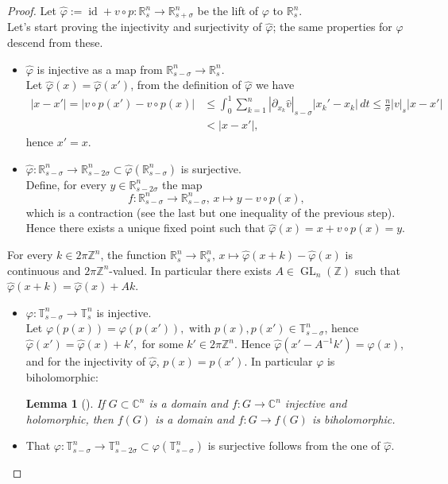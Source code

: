 \documentclass[oneside, 11pt]{amsbook}
\newcommand{\abs}[1]{{\left|#1\right|}}
\newcommand{\T}{\mathbb{T}}
\newcommand{\Z}{\mathbb{Z}}
\newcommand{\R}{\mathbb{R}}
\newcommand{\C}{\mathbb{C}}
\newcommand{\GL}{\operatorname{GL}}
\newcommand{\id}{\operatorname{id}}
\newcommand{\0}{{(0)}}
\newcommand{\3}{{(3)}}
\newtheorem{lemma}{Lemma}
\numberwithin{equation}{section}
\numberwithin{defn}{section}
\numberwithin{prop}{section}
\numberwithin{cor}{section}
\numberwithin{lemma}{section}
\numberwithin{rmk}{section}
\numberwithin{corollary}{section}
\begin{document}
\begin{proof}
	Let $\hat\varphi:= \id + v\circ p : \R^n_s\to\R^n_{s+\sigma}$ be the lift of $\varphi$ to $\R^n_s$.\\Let's start proving the injectivity and surjectivity of $\hat\varphi$; the same properties for $\varphi$ descend from these.
	\begin{itemize}[leftmargin=*]
		\item $\hat\varphi$ is injective as a map from $\R^n_{s-\sigma}\to\R^n_s$.\\Let $\hat\varphi(x)=\hat\varphi(x')$, from the definition of $\hat\varphi$ we have 
		\begin{align*}
			\abs{x -x'}=\abs{v\circ p(x') - v\circ p(x)} &\leq \int_0^1 \sum_{k=1}^n\abs{\partial_{x_k} \hat{v}}_{s-\sigma}\abs{x_k'-x_k}\,dt\leq \frac{n}{\sigma}\abs{v}_s\abs{x-x'}\\ & < \abs{x - x'},
		\end{align*}
		hence $x'=x$.
		\item $\hat\varphi: \R^n_{s-\sigma}\to \R^n_{s-2\sigma}\subset \hat\varphi (\R^n_{s-\sigma})$ is surjective.\\ Define, for every $y\in\R^n_{s-2\sigma}$ the map \[f: \R^n_{s-\sigma}\to\R^n_{s-\sigma},\, x\mapsto y - v\circ p(x),\] which is a contraction (see the last but one inequality of the previous step). Hence there exists a unique fixed point such that $\hat{\varphi}(x) = x + v\circ p(x) = y.$ 
	\end{itemize}
	For every $k\in 2\pi\Z^n$, the function $\R^n_s\to\R^n_s,\, x\mapsto \hat\varphi(x+k) - \hat\varphi(x)$ is continuous and $2\pi\Z^n$-valued. In particular there exists $A\in\GL_n(\Z)$ such that $\hat\varphi(x + k)= \hat\varphi(x) + Ak$.
	\begin{itemize}[leftmargin=*]
		\item $\varphi: \T^n_{s-\sigma}\to\T^n_s$ is injective.\\ 
		Let $\varphi(p(x))=\varphi(p(x')),$ with $p(x),p(x')\in\T^n_{s-\sigma}$, hence $\hat\varphi(x')=\hat\varphi(x) + k' ,$ for some $k'\in 2\pi\Z^n$. Hence $\hat\varphi(x' - A^{-1}k')=\hat\varphi(x)$, and for the injectivity of $\hat\varphi$, $p(x)=p(x')$. In particular $\varphi$ is biholomorphic:
		\begin{lemma}[\cite{Fritzsche-Grauert}] If $G\subset\C^n$ is a domain and $f: G\to\C^n$ injective and holomorphic, then $f(G)$ is a domain and $f: G\to f(G)$ is biholomorphic.
		\end{lemma}
		\item That $\varphi: \T^n_{s-\sigma}\to \T^n_{s-2\sigma}\subset \varphi(\T^n_{s-\sigma})$ is surjective follows from the one of $\hat\varphi$.

\end{itemize}
\end{proof}
\end{document}
